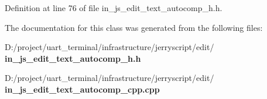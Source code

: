 Definition at line 76 of file in\+\_\+js\+\_\+edit\+\_\+text\+\_\+autocomp\+\_\+h.\+h.



The documentation for this class was generated from the following files\+:\begin{DoxyCompactItemize}
\item 
D\+:/project/uart\+\_\+terminal/infrastructure/jerryscript/edit/\textbf{ in\+\_\+js\+\_\+edit\+\_\+text\+\_\+autocomp\+\_\+h.\+h}\item 
D\+:/project/uart\+\_\+terminal/infrastructure/jerryscript/edit/\textbf{ in\+\_\+js\+\_\+edit\+\_\+text\+\_\+autocomp\+\_\+cpp.\+cpp}\end{DoxyCompactItemize}
